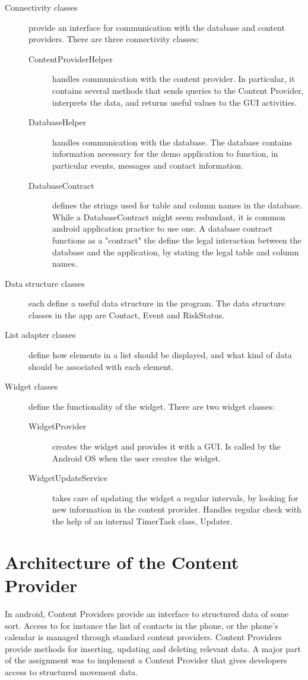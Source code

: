 \begin{description}
\item[Connectivity classes]
provide an interface for communication with the database and content providers. There are three connectivity classes:
\begin{description}
\item[ContentProviderHelper] handles communication with the content provider. In particular, it contains several methods that sends queries to the Content Provider, interprets the data, and returns useful values to the GUI activities.
\item[DatabaseHelper] handles communication with the database. The database contains information necessary for the demo application to function, in particular events, messages and contact information.
\item[DatabaseContract] defines the strings used for table and column names in the database. While a DatabaseContract might seem redundant, it is common android application practice to use one. A database contract functions as a "contract" the define the legal interaction between the database and the application, by stating the legal table and column names.
\end{description}

\item[Data structure classes]
each define a useful data structure in the program. The data structure classes in the app are Contact, Event and RiskStatus.

\item[List adapter classes]
define how elements in a list should be displayed, and what kind of data should be associated with each element.

\item[Widget classes]
define the functionality of the widget. There are two widget classes:
\begin{description}
\item[WidgetProvider] creates the widget and provides it with a GUI. Is called by the Android OS when the user creates the widget.
\item[WidgetUpdateService] takes care of updating the widget a regular intervals, by looking for new information in the content provider. Handles regular check with the help of an internal TimerTask class, Updater.
\end{description}
\end{description}
\section{Architecture of the Content Provider}
In android, Content Providers provide an interface to structured data of some sort. Access to for instance the list of contacts in the phone, or the phone's calendar is managed through standard content providers. Content Providers provide methods for inserting, updating and deleting relevant data. A major part of the assignment was to implement a Content Provider that gives developers access to structured movement data.

